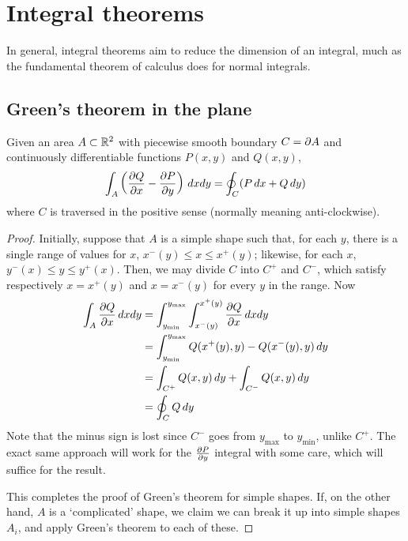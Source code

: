 \documentclass{../../template/note}
\begin{document}
    \section{Integral theorems}

    In general, integral theorems aim to reduce the dimension of an integral, much as the fundamental theorem of calculus does for normal integrals.

    \subsection{Green's theorem in the plane}

    \begin{theorem}
        \label{6.1}
        Given an area \(A \subset \mathbb R^2\) with piecewise smooth boundary \(C = \partial A\) and continuously differentiable functions \(P(x, y)\) and \(Q(x, y)\),
        \begin{align*}
            \int_A \left(\pd Q x - \pd P y \right) \D x dy = \oint_C (P \D x + Q \, dy)
        \end{align*}
        where \(C\) is traversed in the positive sense (normally meaning anti-clockwise).
    \end{theorem}
    
    \begin{proof}
        Initially, suppose that \(A\) is a simple shape such that, for each \(y\), there is a single range of values for \(x\), \(x^-(y) \leq x \leq x^+(y)\); likewise, for each \(x\), \(y^-(x) \leq y \leq y^+(x)\). Then, we may divide \(C\) into \(C^+\) and \(C^-\), which satisfy respectively \(x = x^+(y)\) and \(x = x^-(y)\) for every \(y\) in the range. Now
        \begin{align*}
            \int_A \pd Q x \D x dy &= \int_{y_\text{min}}^{y_\text{max}} \int_{x^-(y)}^{x^+(y)} \pd Q x \D x dy \\
            &= \int_{y_\text{min}}^{y_\text{max}} Q(x^+(y), y) - Q(x^-(y), y) \D y \\
            &= \int_{C^+} Q(x, y) \D y + \int_{C^-} Q(x, y) \D y \\
            &= \oint_C Q \D y
        \end{align*}
        Note that the minus sign is lost since \(C^-\) goes from \(y_\text{max}\) to \(y_\text{min}\), unlike \(C^+\). The exact same approach will work for the \(\pd P y\) integral with some care, which will suffice for the result.
        
        This completes the proof of Green's theorem for simple shapes. If, on the other hand, \(A\) is a `complicated' shape, we claim we can break it up into simple shapes \(A_i\), and apply Green's theorem to each of these.
    \end{proof}
    
\end{document}
